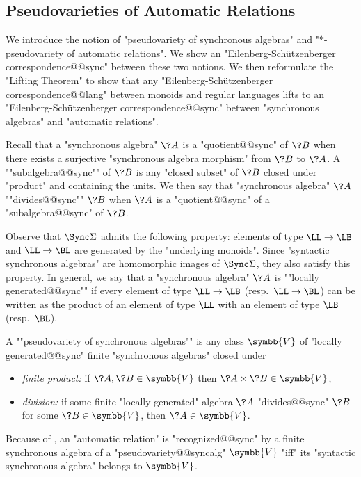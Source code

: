 \subsection{Pseudovarieties of Automatic Relations}
\label{sec:varieties}

We introduce the notion of "pseudovariety of synchronous algebras" 
and "$\ast$-pseudovariety of automatic relations". We show an "Eilenberg-Schützenberger correspondence@@sync" between these two notions. We then reformulate the "Lifting Theorem"
to show that any "Eilenberg-Schützenberger correspondence@@lang" between monoids and regular languages
lifts to an "Eilenberg-Schützenberger correspondence@@sync" between "synchronous algebras" and "automatic relations".

Recall that a "synchronous algebra" $\?A$ is a "quotient@@sync" of $\?B$
when there exists a surjective "synchronous algebra morphism" from $\?B$ to $\?A$.
A ""subalgebra@@sync"" of $\?B$ is any "closed subset" of $\?B$ closed under "product"
and containing the units.
We then say that "synchronous algebra" $\?A$ \AP""divides@@sync"" $\?B$
when $\?A$ is a "quotient@@sync" of a "subalgebra@@sync" of $\?B$.

Observe that $\Sync\Sigma$ admits the following property:
elements of type $\LL\to\LB$ and $\LL\to\BL$ are generated by the "underlying monoids".
Since "syntactic synchronous algebras" are homomorphic images of $\Sync\Sigma$, they also
satisfy this property. In general, we say that a "synchronous algebra" $\?A$ is \AP""locally 
generated@@sync"" if every element of type $\LL\to\LB$ (resp.~$\LL\to\BL$)
can be written as the product of an element of type $\LL$ with an element of type $\LB$ (resp.~$\BL$).

A \AP""pseudovariety of synchronous algebras"" is any class $\symbb{V}$
of "locally generated@@sync" finite "synchronous algebras" closed under
\begin{itemize}
	\item \emph{finite product:} if $\?A, \?B \in \symbb{V}$ then $\?A \times \?B \in \symbb{V}$,
	\item \emph{division:} if some finite "locally generated" algebra $\?A$ "divides@@sync" $\?B$ for some $\?B \in \symbb{V}$, then $\?A \in \symbb{V}$.
\end{itemize}

Because of , an "automatic relation" is "recognized@@sync"
by a finite synchronous algebra of a "pseudovariety@@syncalg" $\symbb{V}$ "iff"
its "syntactic synchronous algebra" belongs to $\symbb{V}$.


